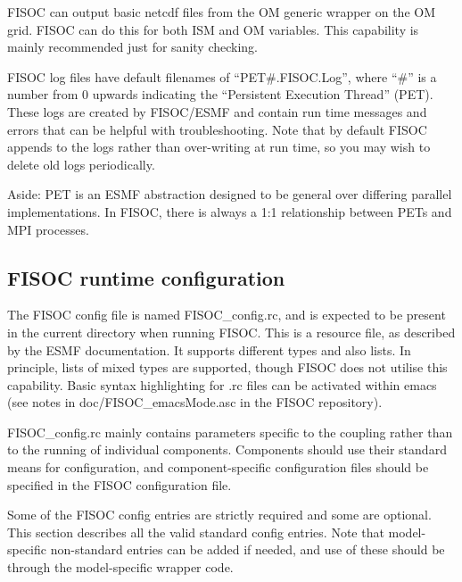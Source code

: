 \documentclass[12pt]{article}
\begin{document}
FISOC can output basic netcdf files from the OM generic wrapper 
on the OM grid. 
FISOC can do this for both ISM and OM variables.
This capability is mainly recommended just for sanity checking.


FISOC log files have default filenames of ``PET\#.FISOC.Log'', where ``\#'' is a number from 0 upwards 
indicating the ``Persistent Execution Thread'' (PET). 
These logs are created by FISOC/ESMF and contain run time messages and errors that can 
be helpful with troubleshooting.
Note that by default FISOC appends to the logs rather than over-writing at run time, so you may wish to delete 
old logs periodically. 

Aside: PET is an ESMF abstraction designed to be general over differing parallel implementations. 
In FISOC, there is always a 1:1 relationship between PETs and MPI processes. 






\subsection{FISOC runtime configuration}
\label{sec:config}

The FISOC config file is named FISOC\_config.rc, and is expected to be present 
in the current directory when running FISOC.  
This is a resource file, as described by the 
ESMF documentation.  It supports different types and also lists. 
In principle, lists of mixed types are supported, though FISOC does not utilise this capability.
Basic syntax highlighting for .rc files can be activated within emacs 
(see notes in doc/FISOC\_emacsMode.asc in the FISOC repository).

FISOC\_config.rc mainly contains parameters specific to the coupling rather than to the running of 
individual components.  
Components should use their standard means for configuration, and component-specific configuration files 
should be specified in the FISOC configuration file.

Some of the FISOC config entries are strictly required and some are optional.
This section describes all the valid standard config entries. 
Note that model-specific non-standard entries can be added if needed, and use of these 
should be through the model-specific wrapper code.
\end{document}
